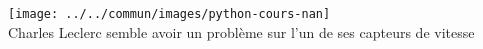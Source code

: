 \documentclass{magnolia}
\begin{document}
  \begin{center}
    \texttt{[image: ../../commun/images/python-cours-nan]}\\
    Charles Leclerc semble avoir un problème sur l'un de ses capteurs de vitesse
  \end{center}

    
  
\end{document}
